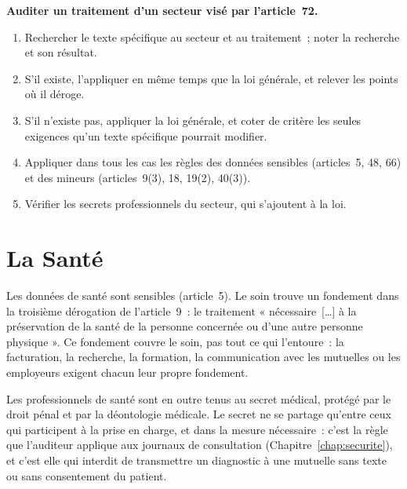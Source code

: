 \begin{boxprocedure}
\textbf{Auditer un traitement d'un secteur visé par l'article~72.}
\begin{enumerate}
    \item Rechercher le texte spécifique au secteur et au traitement~; noter
          la recherche et son résultat.
    \item S'il existe, l'appliquer en même temps que la loi générale, et
          relever les points où il déroge.
    \item S'il n'existe pas, appliquer la loi générale, et coter \NEK{} de
          critère les seules exigences qu'un texte spécifique pourrait
          modifier.
    \item Appliquer dans tous les cas les règles des données sensibles
          (articles~5, 48, 66) et des mineurs (articles~9(3), 18, 19(2),
          40(3)).
    \item Vérifier les secrets professionnels du secteur, qui s'ajoutent à
          la loi.
\end{enumerate}
\end{boxprocedure}

\section{La Santé}
\label{sec:c15-sante}

Les données de santé sont sensibles (article~5). Le soin trouve un
fondement dans la troisième dérogation de l'article~9~: le traitement
« nécessaire~[\ldots] à la préservation de la santé de la personne
concernée ou d'une autre personne physique ». Ce fondement couvre le soin,
pas tout ce qui l'entoure~: la facturation, la recherche, la formation, la
communication avec les mutuelles ou les employeurs exigent chacun leur
propre fondement.

Les professionnels de santé sont en outre tenus au secret médical, protégé
par le droit pénal et par la déontologie médicale. Le secret ne se partage
qu'entre ceux qui participent à la prise en charge, et dans la mesure
nécessaire~: c'est la règle que l'auditeur applique aux journaux de
consultation (Chapitre~\ref{chap:securite}), et c'est elle qui interdit de
transmettre un diagnostic à une mutuelle sans texte ou sans consentement
du patient.

